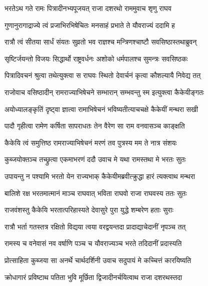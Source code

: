 

\twolineshloka
{भरतेऽथ गते रामः पित्रादीनभ्यपूजयत्}
{राजा दशरथो राममुवाच शृणु राघव} %

\twolineshloka
{गुणानुरागाद्राज्ये त्वं प्रजाभिरभिषेचितः}
{मनसाहं प्रभाते ते यौवराज्यं ददामि ह} %

\twolineshloka
{रात्रौ त्वं सीतया सार्धं संयतः सुव्रतो भव}
{राज्ञश्च मन्त्रिणश्चाष्टौ सवसिष्ठास्तथाब्रुवन्} %

\twolineshloka
{सृष्टिर्जयन्तो विजयः सिद्धार्थो राष्ट्रवर्धनः}
{अशोको धर्मपालश्च सुमन्त्रः सवसिष्ठकः} %

\twolineshloka
{पित्रादिवचनं श्रुत्वा तथेत्युक्त्वा स राघवः}
{स्थितो देवार्चनं कृत्वा कौशल्यायै निवेद्य तत्} %

\twolineshloka
{राजोवाच वसिष्ठादीन् रामराज्याभिषेचने}
{सम्भारान् सम्भवन्तु स्म इत्युक्त्वा कैकेयीङ्गतः} %

\twolineshloka
{अयोध्यालङ्कृतिं दृष्ट्वा ज्ञात्वा रामाभिषेचनं}
{भविष्यतीत्याचचक्षे कैकेयीं मन्थरा सखी} %

\twolineshloka
{पादौ गृहीत्वा रामेण कर्षिता सापराधतः}
{तेन वैरेण सा राम वनवासञ्च काङ्क्षति} %

\twolineshloka
{कैकेयि त्वं समुत्तिष्ठ रामराज्याभिषेचनं}
{मरणं तव पुत्रस्य मम ते नात्र संशयः} %

\twolineshloka
{कुब्जयोक्तञ्च तच्छ्रुत्वा एकमाभरणं ददौ}
{उवाच मे यथा रामस्तथा मे भरतः सुतः} %

\twolineshloka
{उपायन्तु न पश्यामि भरतो येन राज्यभाक्}
{कैकेयीमब्रवीत्क्रुद्धा हारं त्यक्त्वाथ मन्थरा} %

\twolineshloka
{बालिशे रक्ष भरतमात्मानं माञ्च राघवात्}
{भविता राघवो राजा राघवस्य ततः सुतः} %

\twolineshloka
{राजवंशस्तु कैकेयि भरतात्परिहास्यते}
{देवासुरे पुरा युद्धे शम्बरेण हताः सुराः} %

\twolineshloka
{रात्रौ भर्ता गतस्तत्र रक्षितो विद्यया त्वया}
{वरद्वयन्तदा प्रादाद्याचेदानीं नृपञ्च तत्} %

\twolineshloka
{रामस्य च वनेवासं नव वर्षाणि पञ्च च}
{यौवराज्यञ्च भरते तदिदानीं प्रदास्यति} %

\twolineshloka
{प्रोत्साहिता कुब्जया सा अनर्थे चार्थदर्शिनी}
{उवाच सदुपायं मे कच्चित्तं कारयिष्यति} %

\twolineshloka
{क्रोधागारं प्रविष्टाथ पतिता भुवि मूर्छिता}
{द्विजादीनर्चयित्वाथ राजा दशरथस्तदा} %

